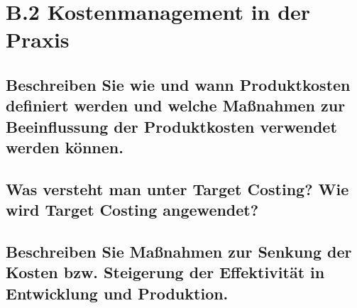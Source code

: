 \section*{B.2 Kostenmanagement in der Praxis}

\subsection{Beschreiben Sie wie und wann Produktkosten definiert werden und welche Ma\ss nahmen zur Beeinflussung der Produktkosten verwendet werden k\"onnen.}

\subsection{Was versteht man unter Target Costing? Wie wird Target Costing angewendet?}

\subsection{Beschreiben Sie Ma\ss nahmen zur Senkung der Kosten bzw. Steigerung der Effektivit\"at in Entwicklung und Produktion.}
